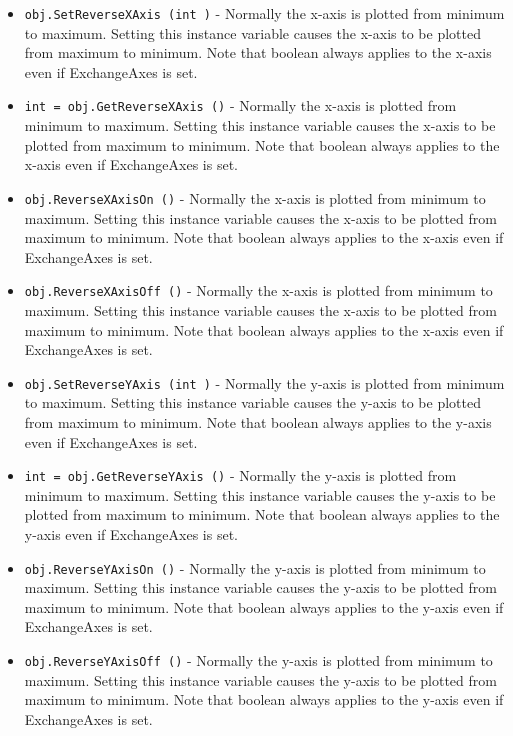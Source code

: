 \begin{itemize}
\item  \verb|obj.SetReverseXAxis (int )| -  Normally the x-axis is plotted from minimum to maximum. Setting this instance
 variable causes the x-axis to be plotted from maximum to minimum. Note that
 boolean always applies to the x-axis even if ExchangeAxes is set.

\item  \verb|int = obj.GetReverseXAxis ()| -  Normally the x-axis is plotted from minimum to maximum. Setting this instance
 variable causes the x-axis to be plotted from maximum to minimum. Note that
 boolean always applies to the x-axis even if ExchangeAxes is set.

\item  \verb|obj.ReverseXAxisOn ()| -  Normally the x-axis is plotted from minimum to maximum. Setting this instance
 variable causes the x-axis to be plotted from maximum to minimum. Note that
 boolean always applies to the x-axis even if ExchangeAxes is set.

\item  \verb|obj.ReverseXAxisOff ()| -  Normally the x-axis is plotted from minimum to maximum. Setting this instance
 variable causes the x-axis to be plotted from maximum to minimum. Note that
 boolean always applies to the x-axis even if ExchangeAxes is set.

\item  \verb|obj.SetReverseYAxis (int )| -  Normally the y-axis is plotted from minimum to maximum. Setting this instance
 variable causes the y-axis to be plotted from maximum to minimum. Note that
 boolean always applies to the y-axis even if ExchangeAxes is set.

\item  \verb|int = obj.GetReverseYAxis ()| -  Normally the y-axis is plotted from minimum to maximum. Setting this instance
 variable causes the y-axis to be plotted from maximum to minimum. Note that
 boolean always applies to the y-axis even if ExchangeAxes is set.

\item  \verb|obj.ReverseYAxisOn ()| -  Normally the y-axis is plotted from minimum to maximum. Setting this instance
 variable causes the y-axis to be plotted from maximum to minimum. Note that
 boolean always applies to the y-axis even if ExchangeAxes is set.

\item  \verb|obj.ReverseYAxisOff ()| -  Normally the y-axis is plotted from minimum to maximum. Setting this instance
 variable causes the y-axis to be plotted from maximum to minimum. Note that
 boolean always applies to the y-axis even if ExchangeAxes is set.


\end{itemize}
